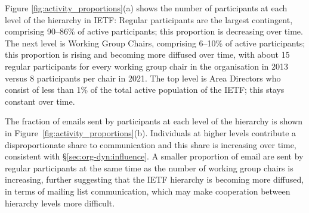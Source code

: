 \documentclass[twocolumn,10pt]{article}
\newcommand{\pb}[1]{\vspace{0.75ex}\noindent{\textbf{#1}}}
\begin{document}

\pb{Role of Working Group Chairs:}
Figure \ref{fig:activity_proportions}(a) shows the number of participants
at each level of the hierarchy in IETF: Regular participants are the
largest contingent, comprising 90--86\% of active participants; this
proportion is decreasing over time.  The next level is Working Group
Chairs, comprising  6--10\% of active participants; this proportion is
rising and becoming more diffused over time, with about 15 regular
participants for every working group chair in the organisation in 2013
versus 8 participants per chair in 2021.  The top level is Area Directors
who consist of less than 1\% of the total active population of the IETF;
this stays constant over time.  

The fraction of emails sent by participants at each level of the hierarchy
is shown in Figure~\ref{fig:activity_proportions}(b). Individuals at higher
levels contribute a disproportionate share to communication and this share
is increasing over time, consistent with \S\ref{sec:org-dyn:influence}. A
smaller proportion of email are sent by regular participants at the same
time as the number of working group chairs is increasing, further
suggesting that the IETF hierarchy is becoming more diffused, in terms of
mailing list communication, which may make cooperation between hierarchy
levels more difficult.
\end{document}
